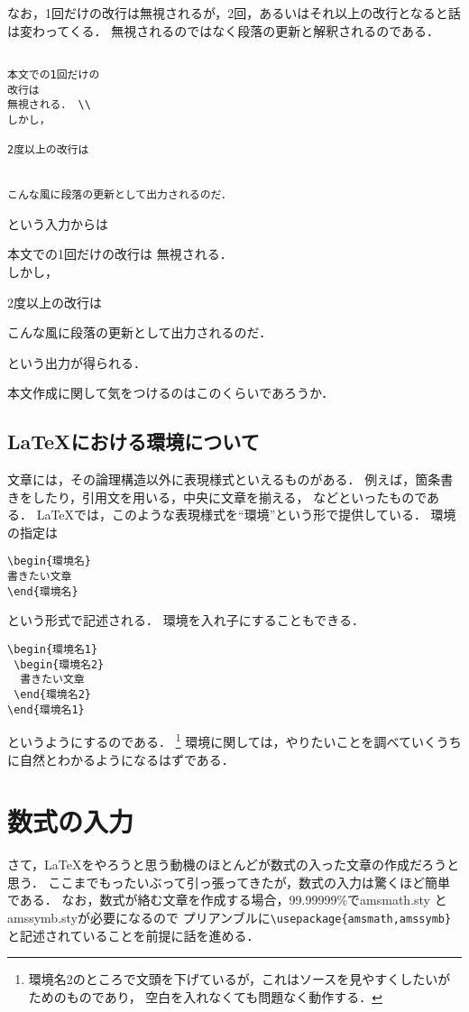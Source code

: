 なお，1回だけの改行は無視されるが，2回，あるいはそれ以上の改行となると話は変わってくる．
無視されるのではなく段落の更新と解釈されるのである．
\begin{verbatim}

本文での1回だけの
改行は
無視される． \\
しかし，

2度以上の改行は


こんな風に段落の更新として出力されるのだ．

\end{verbatim}
という入力からは
\begin{oframed}
本文での1回だけの改行は
無視される． \\
しかし，

2度以上の改行は


こんな風に段落の更新として出力されるのだ．
\end{oframed}
という出力が得られる．

本文作成に関して気をつけるのはこのくらいであろうか．
\subsection{{\LaTeX}における環境について}
文章には，その論理構造以外に表現様式といえるものがある．
例えば，箇条書きをしたり，引用文を用いる，中央に文章を揃える，
などといったものである．
{\LaTeX}では，このような表現様式を``環境''という形で提供している．
環境の指定は
\begin{verbatim}
\begin{環境名}
書きたい文章
\end{環境名}
\end{verbatim}
という形式で記述される．
環境を入れ子にすることもできる．
\begin{verbatim}
\begin{環境名1}
 \begin{環境名2}
  書きたい文章
 \end{環境名2}
\end{環境名1}
\end{verbatim}
というようにするのである．
\footnote{環境名2のところで文頭を下げているが，これはソースを見やすくしたいがためのものであり，
空白を入れなくても問題なく動作する．}
環境に関しては，やりたいことを調べていくうちに自然とわかるようになるはずである．

\section{数式の入力}
さて，{\LaTeX}をやろうと思う動機のほとんどが数式の入った文章の作成だろうと思う．
ここまでもったいぶって引っ張ってきたが，数式の入力は驚くほど簡単である．
なお，数式が絡む文章を作成する場合，99.99999\%でamsmath.sty
とamssymb.styが必要になるので
プリアンブルに\verb|\usepackage{amsmath,amssymb}|と記述されていることを前提に話を進める．
